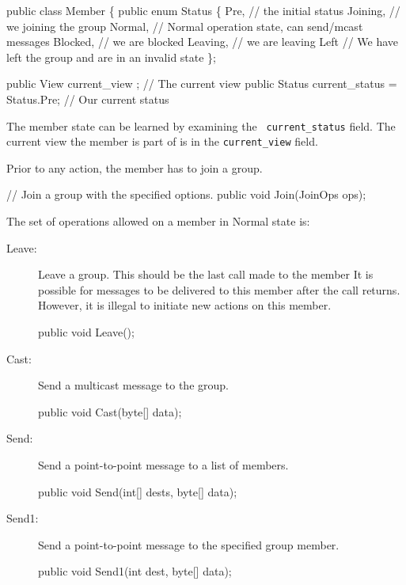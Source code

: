 \begin{description}
  \begin{codebox}
  public class Member \{
      public enum Status \{
          Pre,        // the initial status
          Joining,    // we joining the group
          Normal,     // Normal operation state, can send/mcast messages
          Blocked,    // we are blocked
          Leaving,    // we are leaving
          Left        // We have left the group and are in an invalid state
      \};

      public View current\_view ;		       // The current view
      public Status current\_status = Status.Pre; // Our current status
  \end{codebox}

  The member state can be learned by examining the {\tt
  current\_status} field. The current view the member is part of is in 
  the {\tt current\_view} field. 

  Prior to any action, the member has to join a group.
  \begin{codebox}
  // Join a group with the specified options. 
  public void Join(JoinOps ops);
  \end{codebox}

  The set of operations allowed on a member in Normal state is:
  \begin{description}
    \item[Leave:] Leave a group. This should be the last call made to the member
    It is possible for messages to be delivered to this member after the call
    returns. However, it is illegal to initiate new actions on this member.
    \begin{codebox}
      public void Leave();
    \end{codebox}

    \item[Cast:]
      Send a multicast message to the group.
      \begin{codebox}
	public void Cast(byte[] data);
      \end{codebox}
    
    \item[Send:]
      Send a point-to-point message to a list of members.
      \begin{codebox}
	public void Send(int[] dests, byte[] data);
      \end{codebox}
    
    \item[Send1:]
      Send a point-to-point message to the specified group member.
      \begin{codebox}
	public void Send1(int dest, byte[] data);
      \end{codebox}
      

\end{description}
\end{description}
